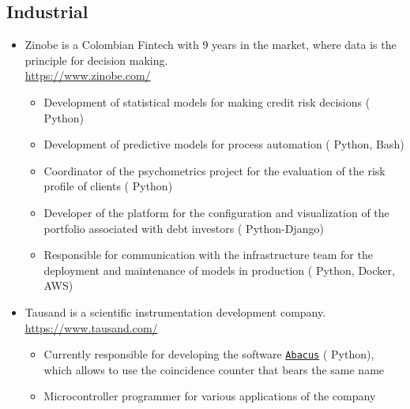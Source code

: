 \documentclass[11pt, letterpaper, sans]{moderncv}        %
\begin{document}
	\subsection{Industrial}
	\begin{itemize}
		\item
		{
			{
				Zinobe is a Colombian Fintech with 9 years in the market, where data is the principle for decision making.
			    \\
				\url{https://www.zinobe.com/}
				\vspace{3pt}
				\begin{itemize}
					\item Development of statistical models for making credit risk decisions ({\color{blue} Python})
					\item Development of predictive models for process automation ({\color{blue} Python, Bash})
					\item Coordinator of the psychometrics project for the evaluation of the risk profile of clients ({\color{blue} Python})
					\item Developer of the platform for the configuration and visualization of the portfolio associated with debt investors ({\color{blue} Python-Django})
					\item Responsible for communication with the infrastructure team for the deployment and maintenance of models in production ({\color{blue} Python, Docker, AWS})
				\end{itemize}
			}
		}
		\item
		{
			{
				Tausand is a scientific instrumentation development company. \url{https://www.tausand.com/}
				\vspace{3pt}
				\begin{itemize}
					\item 
					Currently responsible for developing the software \href{https://www.tausand.com/downloads/}{\texttt{Abacus}} ({\color{blue} Python}), which allows to use the coincidence counter that bears the same name
					\item Microcontroller programmer for various applications of the company
				\end{itemize}
			}
		}
		\vspace{6pt}
	\end{itemize}
\end{document}
